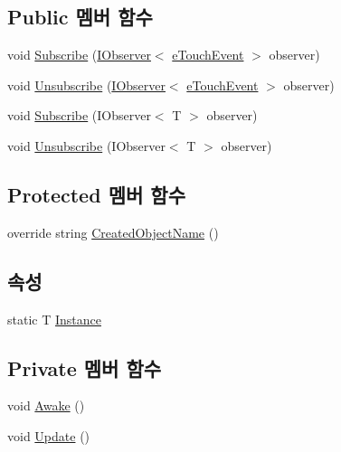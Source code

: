 \subsection*{Public 멤버 함수}
\begin{DoxyCompactItemize}
\item 
void \hyperlink{class_touch_manager_aa68342b07f75f8eda3b420e07f9e4c7b}{Subscribe} (\hyperlink{interface_m_c_n_1_1_i_observer}{I\+Observer}$<$ \hyperlink{_touch_manager_8cs_ae33e321a424fe84ba8b2fdb81ad40a68}{e\+Touch\+Event} $>$ observer)
\item 
void \hyperlink{class_touch_manager_a2c4ace4b27bef64c2e9496240ee4d676}{Unsubscribe} (\hyperlink{interface_m_c_n_1_1_i_observer}{I\+Observer}$<$ \hyperlink{_touch_manager_8cs_ae33e321a424fe84ba8b2fdb81ad40a68}{e\+Touch\+Event} $>$ observer)
\item 
void \hyperlink{interface_m_c_n_1_1_i_observable_a84e57296a612a2d49afbcc7f841ceb0b}{Subscribe} (I\+Observer$<$ T $>$ observer)
\item 
void \hyperlink{interface_m_c_n_1_1_i_observable_a3ff752d344f0b610b1146af7a0fbf067}{Unsubscribe} (I\+Observer$<$ T $>$ observer)
\end{DoxyCompactItemize}
\subsection*{Protected 멤버 함수}
\begin{DoxyCompactItemize}
\item 
override string \hyperlink{class_touch_manager_a8fb5460d8904a0c1a6453b5c49dc3cb4}{Created\+Object\+Name} ()
\end{DoxyCompactItemize}
\subsection*{속성}
\begin{DoxyCompactItemize}
\item 
static T \hyperlink{class_m_c_n_1_1_mono_singletone_aa50c027cca64cf4ad30c1ee5c83e0b78}{Instance}
\end{DoxyCompactItemize}
\subsection*{Private 멤버 함수}
\begin{DoxyCompactItemize}
\item 
void \hyperlink{class_touch_manager_a73c7b6bf98d9834ce87b72012a2a99f1}{Awake} ()
\item 
void \hyperlink{class_touch_manager_a41e6fcfbb7ca31dda8866b6d652f3f73}{Update} ()
\end{DoxyCompactItemize}
